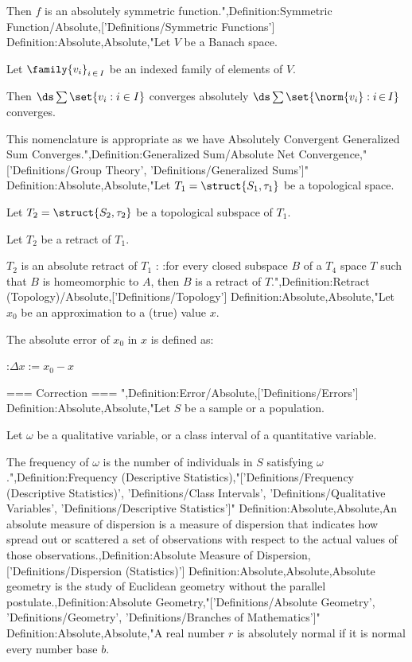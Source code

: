 Then $f$ is an absolutely symmetric function.",Definition:Symmetric Function/Absolute,['Definitions/Symmetric Functions']
Definition:Absolute,Absolute,"Let $V$ be a Banach space.

Let $\family {v_i}_{i \mathop \in I}$ be an indexed family of elements of $V$.


Then $\ds \sum \set {v_i: i \in I}$ converges absolutely  $\ds \sum \set {\norm {v_i}: i \mathop \in I}$ converges.

This nomenclature is appropriate as we have Absolutely Convergent Generalized Sum Converges.",Definition:Generalized Sum/Absolute Net Convergence,"['Definitions/Group Theory', 'Definitions/Generalized Sums']"
Definition:Absolute,Absolute,"Let $T_1 = \struct {S_1, \tau_1}$ be a topological space.

Let $T_2 = \struct {S_2, \tau_2}$ be a topological subspace of $T_1$.


Let $T_2$ be a retract of $T_1$.


$T_2$ is an absolute retract of $T_1$ :
:for every closed subspace $B$ of a $T_4$ space $T$ such that $B$ is homeomorphic to $A$, then $B$ is a retract of $T$.",Definition:Retract (Topology)/Absolute,['Definitions/Topology']
Definition:Absolute,Absolute,"Let $x_0$ be an approximation to a (true) value $x$.


The absolute error of $x_0$ in $x$ is defined as:

:$\Delta x := x_0 - x$


=== Correction ===
",Definition:Error/Absolute,['Definitions/Errors']
Definition:Absolute,Absolute,"Let $S$ be a sample or a population.

Let $\omega$ be a qualitative variable, or a class interval of a quantitative variable.


The frequency of $\omega$ is the number of individuals in $S$ satisfying $\omega$.",Definition:Frequency (Descriptive Statistics),"['Definitions/Frequency (Descriptive Statistics)', 'Definitions/Class Intervals', 'Definitions/Qualitative Variables', 'Definitions/Descriptive Statistics']"
Definition:Absolute,Absolute,An absolute measure of dispersion is a measure of dispersion that indicates how spread out or scattered a set of observations with respect to the actual values of those observations.,Definition:Absolute Measure of Dispersion,['Definitions/Dispersion (Statistics)']
Definition:Absolute,Absolute,Absolute geometry is the study of Euclidean geometry without the parallel postulate.,Definition:Absolute Geometry,"['Definitions/Absolute Geometry', 'Definitions/Geometry', 'Definitions/Branches of Mathematics']"
Definition:Absolute,Absolute,"A real number $r$ is absolutely normal if it is normal  every number base $b$.

